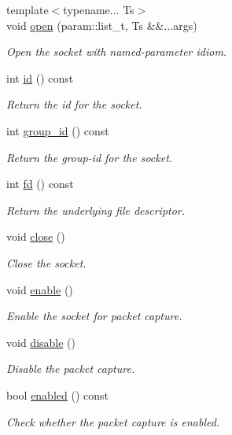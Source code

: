 \begin{DoxyCompactItemize}
{\footnotesize template$<$typename... Ts$>$ }\\void \hyperlink{classnet_1_1pfq_a5e435f3be2e02f3eeb73aad94f2fe27c}{open} (param\-::list\-\_\-t, Ts \&\&...args)
\begin{DoxyCompactList}\small\item\em Open the socket with named-\/parameter idiom. \end{DoxyCompactList}\item 
int \hyperlink{classnet_1_1pfq_a9ee042216fa93f524050a10a195935a3}{id} () const 
\begin{DoxyCompactList}\small\item\em Return the id for the socket. \end{DoxyCompactList}\item 
int \hyperlink{classnet_1_1pfq_a804ef7e3c673827799c6ade879fe5760}{group\-\_\-id} () const 
\begin{DoxyCompactList}\small\item\em Return the group-\/id for the socket. \end{DoxyCompactList}\item 
int \hyperlink{classnet_1_1pfq_a9a824d52bd660d12700f8475f04230dd}{fd} () const 
\begin{DoxyCompactList}\small\item\em Return the underlying file descriptor. \end{DoxyCompactList}\item 
void \hyperlink{classnet_1_1pfq_a3b96eb3ab597bc88142239fa840dbbe0}{close} ()
\begin{DoxyCompactList}\small\item\em Close the socket. \end{DoxyCompactList}\item 
void \hyperlink{classnet_1_1pfq_a503deb297624d708efe3ed2e4ae0a3ef}{enable} ()
\begin{DoxyCompactList}\small\item\em Enable the socket for packet capture. \end{DoxyCompactList}\item 
void \hyperlink{classnet_1_1pfq_a2396ccadb0f467760355f352fdc9d989}{disable} ()
\begin{DoxyCompactList}\small\item\em Disable the packet capture. \end{DoxyCompactList}\item 
bool \hyperlink{classnet_1_1pfq_ac1dd1a25c65ff07d8ad4d681dc0633c8}{enabled} () const 
\begin{DoxyCompactList}\small\item\em Check whether the packet capture is enabled. \end{DoxyCompactList}\item 

\end{DoxyCompactItemize}
